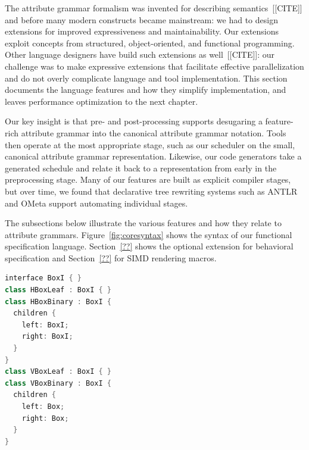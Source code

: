 The attribute grammar formalism was invented for describing semantics~[[CITE]] and before many modern constructs became mainstream: we had to design extensions for improved expressiveness and maintainability. Our extensions exploit concepts from structured, object-oriented, and functional programming. Other language designers have build such extensions as well~[[CITE]]: our challenge was to make expressive extensions that facilitate effective parallelization and do not overly complicate language and tool implementation. This section documents the language features and how they simplify implementation, and leaves performance optimization to the next chapter.

Our key insight is that pre- and post-processing supports desugaring a feature-rich attribute grammar into the canonical attribute grammar notation. Tools then operate at the most appropriate stage, such as our scheduler on the small, canonical attribute grammar representation. Likewise, our code generators take a generated schedule and relate it back to a representation from early in the preprocessing stage. Many of our features are built as explicit compiler stages, but over time, we found that declarative tree rewriting systems such as ANTLR and OMeta support automating individual stages.

The subsections below illustrate the various features and how they relate to attribute grammars. Figure~\ref{fig:coresyntax} shows the syntax of our functional specification language. Section~\ref{??} shows the optional extension for behavioral specification and Section~\ref{??} for SIMD rendering macros. 


\newsavebox{\ifacegrammar}
\begin{lrbox}{\ifacegrammar}%
\begin{lstlisting}[language=C++,morekeywords={interface,class,children}]
interface BoxI { }
class HBoxLeaf : BoxI { }
class HBoxBinary : BoxI { 
  children {
    left: BoxI;
    right: BoxI;
  }
}
class VBoxLeaf : BoxI { }
class VBoxBinary : BoxI { 
  children {
    left: Box;
    right: Box;
  }
}
\end{lstlisting}
\end{lrbox}




